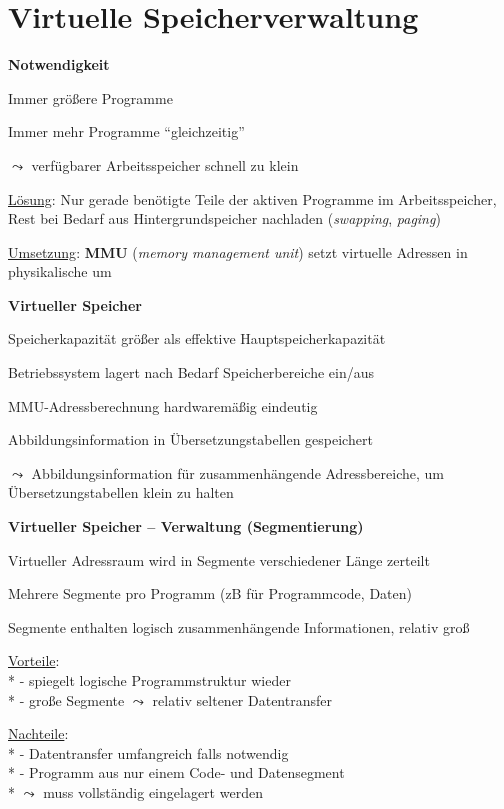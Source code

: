 \section{Virtuelle Speicherverwaltung}

\textbf{Notwendigkeit}
\begin{items}
  \item Immer größere Programme
  \item Immer mehr Programme "`gleichzeitig"'
  \item \( \leadsto \) verfügbarer Arbeitsspeicher schnell zu klein
  \item \underline{Lösung}: Nur gerade benötigte Teile der aktiven Programme im Arbeitsspeicher, Rest bei Bedarf aus Hintergrundspeicher nachladen (\emph{swapping}, \emph{paging})
  \item \underline{Umsetzung}: \textbf{MMU} (\emph{memory management unit}) setzt virtuelle Adressen in physikalische um
\end{items}

\textbf{Virtueller Speicher}
\begin{items}
  \item Speicherkapazität größer als effektive Hauptspeicherkapazität
  \item Betriebssystem lagert nach Bedarf Speicherbereiche ein/aus
  \item MMU-Adressberechnung hardwaremäßig eindeutig
  \item Abbildungsinformation in Übersetzungstabellen gespeichert
  \item \( \leadsto \) Abbildungsinformation für zusammenhängende Adressbereiche, um Übersetzungstabellen klein zu halten
\end{items}

\textbf{Virtueller Speicher -- Verwaltung (Segmentierung)}
\begin{items}
  \item Virtueller Adressraum wird in Segmente verschiedener Länge zerteilt
  \item Mehrere Segmente pro Programm (zB für Programmcode, Daten)
  \item Segmente enthalten logisch zusammenhängende Informationen, relativ groß
  \item \underline{Vorteile}: \\*
    - spiegelt logische Programmstruktur wieder \\*
    - große Segmente \( \leadsto \) relativ seltener Datentransfer
  \item \underline{Nachteile}: \\*
    - Datentransfer umfangreich falls notwendig \\*
    - Programm aus nur einem Code- und Datensegment \\* \phantom{-} \( \leadsto \) muss vollständig eingelagert werden
\end{items}

